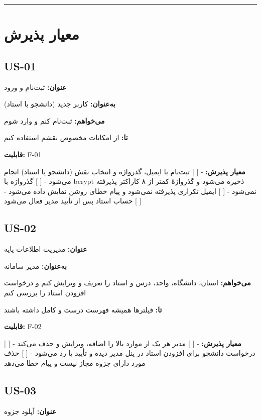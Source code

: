 \documentclass[12pt, a4paper]{article}
\begin{document}
\begin{center}\rule{0.5\linewidth}{0.5pt}\end{center}

\section{معیار پذیرش}

\subsection{US-01}

\textbf{عنوان:} ثبت‌نام و ورود

\textbf{به‌عنوان:} کاربر جدید (دانشجو یا استاد)

\textbf{می‌خواهم:} ثبت‌نام کنم و وارد شوم

\textbf{تا:} از امکانات مخصوص نقشم استفاده کنم

\textbf{قابلیت:} F-01

\textbf{معیار پذیرش:}
- {[} {]} ثبت‌نام با ایمیل، گذرواژه و انتخاب نقش (دانشجو یا استاد) انجام می‌شود
- {[} {]} گذرواژه با bcrypt ذخیره می‌شود و گذرواژهٔ کمتر از ۸ کاراکتر پذیرفته نمی‌شود
- {[} {]} ایمیل تکراری پذیرفته نمی‌شود و پیام خطای روشن نمایش داده می‌شود
- {[} {]} حساب استاد پس از تأیید مدیر فعال می‌شود

\subsection{US-02}

\textbf{عنوان:} مدیریت اطلاعات پایه

\textbf{به‌عنوان:} مدیر سامانه

\textbf{می‌خواهم:} استان، دانشگاه، واحد، درس و استاد را تعریف و ویرایش کنم و درخواست افزودن استاد را بررسی کنم

\textbf{تا:} فیلترها همیشه فهرست درست و کامل داشته باشند

\textbf{قابلیت:} F-02

\textbf{معیار پذیرش:}
- {[} {]} مدیر هر یک از موارد بالا را اضافه، ویرایش و حذف می‌کند
- {[} {]} درخواست دانشجو برای افزودن استاد در پنل مدیر دیده و تأیید یا رد می‌شود
- {[} {]} حذف مورد دارای جزوه مجاز نیست و پیام خطا می‌دهد

\subsection{US-03}

\textbf{عنوان:} آپلود جزوه
\end{document}
